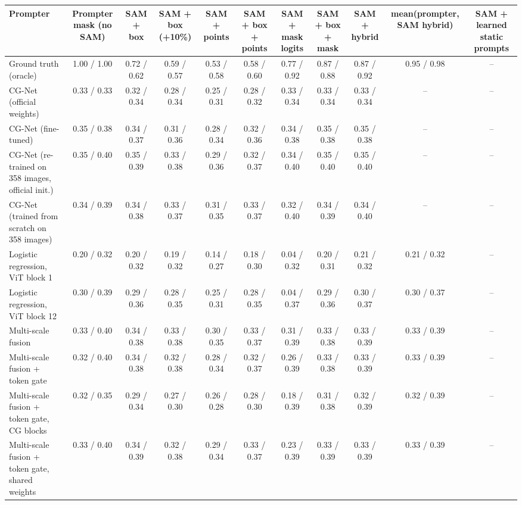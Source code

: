 \begin{table}[htbp]
\centering
\small
\begin{adjustbox}{max width=\linewidth}
\begin{tabular}{lcccccccccc}
\toprule
Prompter & Prompter mask (no SAM) & SAM + box & SAM + box (+10\%) & SAM + points & SAM + box + points & SAM + mask logits & SAM + box + mask & SAM + hybrid & mean(prompter, SAM hybrid) & SAM + learned static prompts \\
\midrule
Ground truth (oracle) & 1.00 / 1.00 & 0.72 / 0.62 & 0.59 / 0.57 & 0.53 / 0.58 & 0.58 / 0.60 & 0.77 / 0.92 & 0.87 / 0.88 & 0.87 / 0.92 & 0.95 / 0.98 & -- \\
CG-Net (official weights) & 0.33 / 0.33 & 0.32 / 0.34 & 0.28 / 0.34 & 0.25 / 0.31 & 0.28 / 0.32 & 0.33 / 0.34 & 0.33 / 0.34 & 0.33 / 0.34 & -- & -- \\
CG-Net (fine-tuned) & 0.35 / 0.38 & 0.34 / 0.37 & 0.31 / 0.36 & 0.28 / 0.34 & 0.32 / 0.36 & 0.34 / 0.38 & 0.35 / 0.38 & 0.35 / 0.38 & -- & -- \\
CG-Net (re-trained on 358 images, official init.) & 0.35 / 0.40 & 0.35 / 0.39 & 0.33 / 0.38 & 0.29 / 0.36 & 0.32 / 0.37 & 0.34 / 0.40 & 0.35 / 0.40 & 0.35 / 0.40 & -- & -- \\
CG-Net (trained from scratch on 358 images) & 0.34 / 0.39 & 0.34 / 0.38 & 0.33 / 0.37 & 0.31 / 0.35 & 0.33 / 0.37 & 0.32 / 0.40 & 0.34 / 0.39 & 0.34 / 0.40 & -- & -- \\
Logistic regression, ViT block 1 & 0.20 / 0.32 & 0.20 / 0.32 & 0.19 / 0.32 & 0.14 / 0.27 & 0.18 / 0.30 & 0.04 / 0.32 & 0.20 / 0.31 & 0.21 / 0.32 & 0.21 / 0.32 & -- \\
Logistic regression, ViT block 12 & 0.30 / 0.39 & 0.29 / 0.36 & 0.28 / 0.35 & 0.25 / 0.31 & 0.28 / 0.35 & 0.04 / 0.37 & 0.29 / 0.36 & 0.30 / 0.37 & 0.30 / 0.37 & -- \\
Multi-scale fusion & 0.33 / 0.40 & 0.34 / 0.38 & 0.33 / 0.38 & 0.30 / 0.35 & 0.33 / 0.37 & 0.31 / 0.39 & 0.33 / 0.38 & 0.33 / 0.39 & 0.33 / 0.39 & -- \\
Multi-scale fusion + token gate & 0.32 / 0.40 & 0.34 / 0.38 & 0.32 / 0.38 & 0.28 / 0.34 & 0.32 / 0.37 & 0.26 / 0.39 & 0.33 / 0.38 & 0.33 / 0.39 & 0.33 / 0.39 & -- \\
Multi-scale fusion + token gate, CG blocks & 0.32 / 0.35 & 0.29 / 0.34 & 0.27 / 0.30 & 0.26 / 0.28 & 0.28 / 0.30 & 0.18 / 0.39 & 0.31 / 0.38 & 0.32 / 0.39 & 0.32 / 0.39 & -- \\
Multi-scale fusion + token gate, shared weights & 0.33 / 0.40 & 0.34 / 0.39 & 0.32 / 0.38 & 0.29 / 0.34 & 0.33 / 0.37 & 0.23 / 0.39 & 0.33 / 0.39 & 0.33 / 0.39 & 0.33 / 0.39 & -- \\

\end{tabular}
\end{adjustbox}
\end{table}
